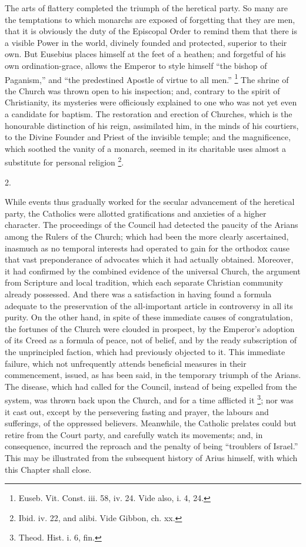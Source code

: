 The arts of flattery completed the triumph of the heretical party.
So many are the temptations to which monarchs are exposed of
forgetting that they are men, that it is obviously the duty of the
Episcopal Order to remind them that there is a visible Power in the
world, divinely founded and protected, superior to their own. But
Eusebius places himself at the feet of a heathen; and forgetful of his
own ordination-grace, allows the Emperor to style himself ``the
bishop of Paganism,'' and ``the predestined Apostle of virtue
to all men.'' \footnote{Euseb. Vit. Const. iii. 58, iv. 24. Vide
also, i. 4, 24.} The
shrine of the Church was thrown open to his inspection; and, contrary
to the spirit of Christianity, its mysteries were officiously
explained to one who was not yet even a candidate for baptism. The restoration and erection of Churches, which is the honourable
distinction of his reign, assimilated him, in the minds of his
courtiers, to the Divine Founder and Priest of the invisible temple;
and the magnificence, which soothed the vanity of a monarch, seemed in
its charitable uses almost a substitute for personal religion \footnote{Ibid. iv. 22, and alibi. Vide Gibbon, ch. xx.}.

2.

While events thus gradually worked for the secular advancement of
the heretical party, the Catholics were allotted gratifications and
anxieties of a higher character. The proceedings of the Council had
detected the paucity of the Arians among the Rulers of the Church;
which had been the more clearly ascertained, inasmuch as no temporal
interests had operated to gain for the orthodox cause that vast
preponderance of advocates which it had actually obtained. Moreover,
it had confirmed by the combined evidence of the universal Church, the
argument from Scripture and local tradition, which each separate
Christian community already possessed. And there was a satisfaction in
having found a formula adequate to the preservation of the
all-important article in controversy in all its purity. On the other
hand, in spite of these immediate causes of congratulation, the
fortunes of the Church were clouded in prospect, by the Emperor's
adoption of its Creed as a formula of peace, not of belief, and by the
ready subscription of the unprincipled faction, which had previously
objected to it. This immediate failure, which not unfrequently attends
beneficial measures in their commencement, issued, as has been
said, in the temporary triumph of the Arians. The disease, which had
called for the Council, instead of being expelled from the system, was
thrown back upon the Church, and for a time afflicted it \footnote{Theod. Hist. i. 6, fin.}; nor was it cast out, except by the persevering fasting and
prayer, the labours and sufferings, of the oppressed believers.
Meanwhile, the Catholic prelates could but retire from the Court
party, and carefully watch its movements; and, in consequence,
incurred the reproach and the penalty of being ``troublers of
Israel.'' This may be illustrated from the subsequent history of
Arius himself, with which this Chapter shall close.

